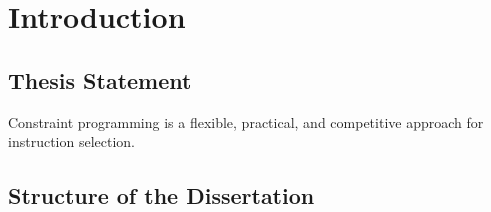 %

\chapter{Introduction}

\section{Thesis Statement}

\begin{statement}
  Constraint programming is a flexible, practical, and competitive approach for
  instruction selection.
\end{statement}

\section{Structure of the Dissertation}
